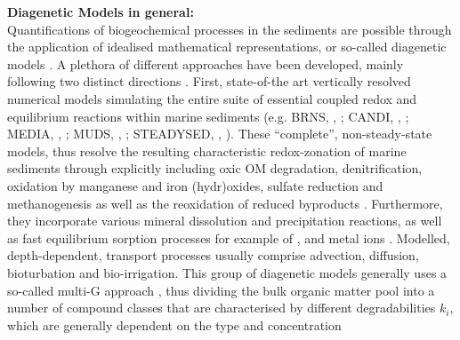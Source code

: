 \documentclass[gmd, manuscript]{copernicus}
\begin{document}
\textbf{Diagenetic Models in general:}\\
Quantifications of biogeochemical processes in the sediments are possible through the application of idealised mathematical representations, or so-called diagenetic models \citep[see e.g.][]{berner_early_1980, boudreau1997diagenetic}.
A plethora of different approaches have been developed, mainly following two distinct directions \citep{arndt_quantifying_2013}. 
First, state-of-the art vertically resolved numerical models simulating the entire suite of essential coupled redox and equilibrium reactions within marine sediments %
(e.g. BRNS, \citeauthor{aguilera_knowledge-based_2005}, \citeyear{aguilera_knowledge-based_2005}; 
CANDI, \citeauthor{boudreau_method--lines_1996}, \citeyear{boudreau_method--lines_1996}; MEDIA, \citeauthor{meysman_reactive_2003}, \citeyear{meysman_reactive_2003}; MUDS, \citeauthor{archer_model_2002}, \citeyear{archer_model_2002}; 
STEADYSED, \citeauthor{cappellen_cycling_1996}, \citeyear{cappellen_cycling_1996}). 
These ``complete'', non-steady-state models, thus resolve the resulting characteristic redox-zonation of marine sediments through explicitly including oxic OM degradation, 
denitrification, oxidation by manganese and iron (hydr)oxides, sulfate reduction and methanogenesis as well as the reoxidation of reduced byproducts 
\citep[i.e. , , , , , see e.g.][]{regnier_quantitative_2011, arndt_quantifying_2013}. 
Furthermore, they incorporate various mineral dissolution and precipitation reactions, as well as fast equilibrium sorption processes for example of 
,  and metal ions \citep[i.e. ,  and , compare][]{cappellen_cycling_1996, meysman_reactive_2003}. 
Modelled, depth-dependent, transport processes usually comprise advection, diffusion, bioturbation and bio-irrigation.   
This group of diagenetic models generally uses a so-called multi-G approach \citep{joergensen_comparison_1978_2, berner_early_1980}, thus dividing the bulk organic 
matter pool into a number of compound classes that are characterised by different degradabilities $k_i$, which are generally dependent on the type and concentration 
\end{document}
